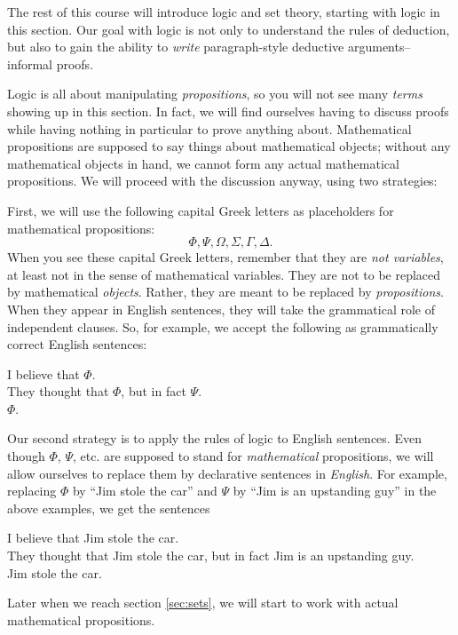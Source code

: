 \documentclass[12pt]{article}
\newcounter{rule}
\def\pA{\Phi}
\def\pB{\Psi}
\def\pC{\Omega}
\def\pD{\Sigma}
\def\pE{\Gamma}
\def\pF{\Delta}
\begin{document}
The rest of this course will introduce logic and set theory, starting with logic in this section.
Our goal with logic is not only to understand the rules of deduction,
but also to gain the ability to \emph{write} paragraph-style deductive arguments-- informal proofs.

Logic is all about manipulating \emph{propositions}, so you will not see many \emph{terms} showing up in this section.
In fact, we will find ourselves having to discuss proofs while having nothing in particular to prove anything about.
Mathematical propositions are supposed to say things about mathematical objects;
without any mathematical objects in hand, we cannot form any actual mathematical propositions.
We will proceed with the discussion anyway, using two strategies:

First, we will use the following capital Greek letters as placeholders for mathematical propositions:
$$
\pA,
\pB,
\pC,
\pD,
\pE,
\pF.
$$
When you see these capital Greek letters, remember that they are \emph{not variables},
at least not in the sense of mathematical variables. They are not to be replaced by mathematical \emph{objects}.
Rather, they are meant to be replaced by \emph{propositions}.
When they appear in English sentences, they will take the grammatical role of independent clauses.
So, for example, we accept the following as grammatically correct English sentences:
\begin{adjustwidth}{2em}{}
I believe that $\pA$.\\
They thought that $\pA$, but in fact $\pB$.\\
$\pA$.
\end{adjustwidth}

Our second strategy
is to apply the rules of logic to English sentences.
Even though $\pA$, $\pB$, etc. are supposed to stand for \emph{mathematical} propositions,
we will allow ourselves to replace them by declarative sentences in \emph{English}.
For example, replacing $\pA$ by ``Jim stole the car'' and $\pB$ by ``Jim is an upstanding guy'' in the above examples, we get the sentences
\begin{adjustwidth}{2em}{}
I believe that Jim stole the car.\\
They thought that Jim stole the car, but in fact Jim is an upstanding guy.\\
Jim stole the car.
\end{adjustwidth}
Later when we reach section
\ref{sec:sets}, we will start to work with actual mathematical propositions.
\end{document}
